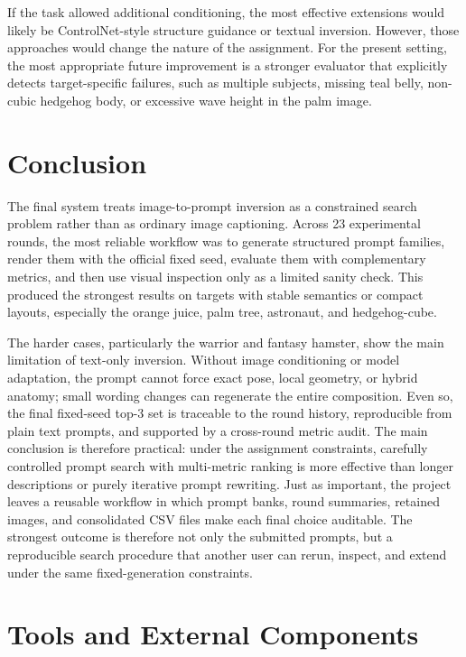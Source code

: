 \documentclass[runningheads]{llncs}
\begin{document}
If the task allowed additional conditioning, the most effective extensions would likely be ControlNet-style structure guidance or textual inversion. However, those approaches would change the nature of the assignment. For the present setting, the most appropriate future improvement is a stronger evaluator that explicitly detects target-specific failures, such as multiple subjects, missing teal belly, non-cubic hedgehog body, or excessive wave height in the palm image.

\enlargethispage{3\baselineskip}
\section{Conclusion}

The final system treats image-to-prompt inversion as a constrained search problem rather than as ordinary image captioning. Across 23 experimental rounds, the most reliable workflow was to generate structured prompt families, render them with the official fixed seed, evaluate them with complementary metrics, and then use visual inspection only as a limited sanity check. This produced the strongest results on targets with stable semantics or compact layouts, especially the orange juice, palm tree, astronaut, and hedgehog-cube.

The harder cases, particularly the warrior and fantasy hamster, show the main limitation of text-only inversion. Without image conditioning or model adaptation, the prompt cannot force exact pose, local geometry, or hybrid anatomy; small wording changes can regenerate the entire composition. Even so, the final fixed-seed top-3 set is traceable to the round history, reproducible from plain text prompts, and supported by a cross-round metric audit. The main conclusion is therefore practical: under the assignment constraints, carefully controlled prompt search with multi-metric ranking is more effective than longer descriptions or purely iterative prompt rewriting. Just as important, the project leaves a reusable workflow in which prompt banks, round summaries, retained images, and consolidated CSV files make each final choice auditable. The strongest outcome is therefore not only the submitted prompts, but a reproducible search procedure that another user can rerun, inspect, and extend under the same fixed-generation constraints.

\begingroup
\footnotesize

\section*{Tools and External Components}
\end{document}
